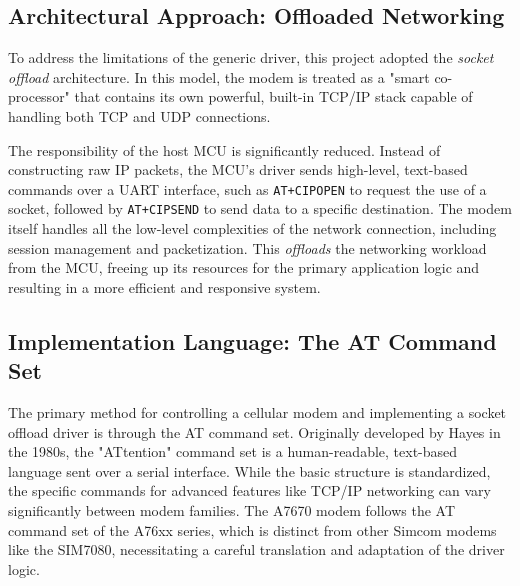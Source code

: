 \subsection{Architectural Approach: Offloaded Networking}
To address the limitations of the generic driver, this project adopted the \textit{socket offload} architecture. In this model, the modem is treated as a "smart co-processor" that contains its own powerful, built-in TCP/IP stack capable of handling both TCP and UDP connections.

The responsibility of the host MCU is significantly reduced. Instead of constructing raw IP packets, the MCU's driver sends high-level, text-based commands over a UART interface, such as \texttt{AT+CIPOPEN} to request the use of a socket, followed by \texttt{AT+CIPSEND} to send data to a specific destination. The modem itself handles all the low-level complexities of the network connection, including session management and packetization. This \textit{offloads} the networking workload from the MCU, freeing up its resources for the primary application logic and resulting in a more efficient and responsive system.


\subsection{Implementation Language: The AT Command Set}
The primary method for controlling a cellular modem and implementing a socket offload driver is through the AT command set. Originally developed by Hayes in the 1980s, the "ATtention" command set is a human-readable, text-based language sent over a serial interface. While the basic structure is standardized, the specific commands for advanced features like TCP/IP networking can vary significantly between modem families. The A7670 modem follows the AT command set of the A76xx series, which is distinct from other Simcom modems like the SIM7080, necessitating a careful translation and adaptation of the driver logic.



